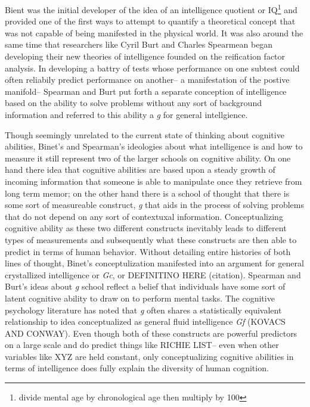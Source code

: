 \documentclass[]{book}
\let\rmarkdownfootnote\footnote%
\def\footnote{\protect\rmarkdownfootnote}
\theoremstyle{definition}
\theoremstyle{definition}
\theoremstyle{definition}
\theoremstyle{remark}
\begin{document}
Bient was the initial developer of the idea of an intelligence quotient
or IQ\footnote{divide mental age by chronological age then multiply by
  100} and provided one of the first ways to attempt to quantify a
theoretical concept that was not capable of being manifested in the
physical world. It was also around the same time that researchers like
Cyril Burt and Charles Spearmean began developing their new theories of
intelligence founded on the reification factor analysis. In developing a
battry of tests whose performance on one subtest could often reliabily
predict performance on another-- a manifestation of the postive
manifold-- Spearman and Burt put forth a separate conception of
intelligence based on the ability to solve problems without any sort of
background information and referred to this ability a \emph{g} for
general intellgience.

Though seemingly unrelated to the current state of thinking about
cognitive abilities, Binet's and Spearman's ideologies about what
intelligence is and how to measure it still represent two of the larger
schools on cognitive ability. On one hand there idea that cognitive
abilities are based upon a steady growth of incoming information that
someone is able to manipulate once they retrieve from long term memor;
on the other hand there is a school of thought that there is some sort
of measureable construct, \emph{g} that aids in the process of solving
problems that do not depend on any sort of contextuxal information.
Conceptualizing cognitive ability as these two different constructs
inevitably leads to different types of measurements and subsequently
what these constructs are then able to predict in terms of human
behavior. Without detailing entire histories of both lines of thought,
Binet's conceptulization manifested into an argument for general
crystallized intelligence or \emph{Gc}, or DEFINITINO HERE (citation).
Spearman and Burt's ideas about \emph{g} school reflect a belief that
individuals have some sort of latent cognitive ability to draw on to
perform mental tasks. The cognitive psychology literature has noted that
\emph{g} often shares a statistically equivalent relationship to idea
conceptualized as general fluid intelligence \emph{Gf} (KOVACS AND
CONWAY). Even though both of these constructs are powerful predictors on
a large scale and do predict things like RICHIE LIST-- even when other
variables like XYZ are held constant, only conceptualizing cognitive
abilities in terms of intelligence does fully explain the diversity of
human cognition.
\end{document}

